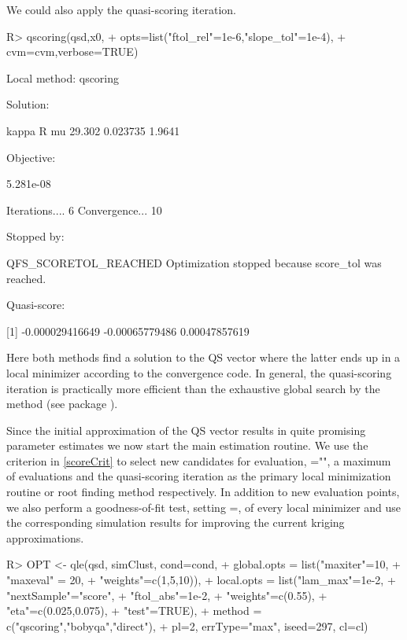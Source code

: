 \documentclass[article, nojss]{jss}
\numberwithin{equation}{section}			%
\begin{document}
We could also apply the quasi-scoring iteration.
\begin{Schunk}
\begin{Sinput}
R> qscoring(qsd,x0,
+   opts=list("ftol_rel"=1e-6,"slope_tol"=1e-4),
+   cvm=cvm,verbose=TRUE)
\end{Sinput}
\begin{Soutput}
Local method:  qscoring 

Solution: 

   kappa           R          mu    
  29.302    0.023735      1.9641    

Objective:

 5.281e-08 

Iterations.... 6 
Convergence... 10 

Stopped by: 

 QFS_SCORETOL_REACHED 
 Optimization stopped because score_tol was reached. 

Quasi-score:

[1]    -0.000029416649    -0.00065779486     0.00047857619  
\end{Soutput}
\end{Schunk}
Here both methods find a solution to the QS vector where the latter ends up in a
local minimizer according to the convergence code. In general, the quasi-scoring
iteration is practically more efficient than the exhaustive global search by the
method  (see package ).\par
%
Since the initial approximation of the QS vector results in quite
promising parameter estimates we now start the main estimation routine. We use
the criterion in \eqref{scoreCrit} to select new candidates for evaluation, ="",
a maximum of  evaluations and the quasi-scoring iteration as the
primary local minimization routine or root finding method respectively. In
addition to new evaluation points, we also perform a goodness-of-fit test,
setting =, of every local minimizer and use
the corresponding simulation results for improving the current kriging approximations.
\begin{Schunk}
\begin{Sinput}
R> OPT <- qle(qsd, simClust, cond=cond,  
+ 		global.opts = list("maxiter"=10,
+                            "maxeval" = 20,
+                            "weights"=c(1,5,10)),
+ 		local.opts = list("lam_max"=1e-2,
+                           "nextSample"="score",
+                           "ftol_abs"=1e-2,
+                           "weights"=c(0.55),
+                           "eta"=c(0.025,0.075),
+                           "test"=TRUE),
+ 		method = c("qscoring","bobyqa","direct"),
+ 		pl=2, errType="max", iseed=297, cl=cl)
\end{Sinput}
\end{Schunk}
\end{document}
